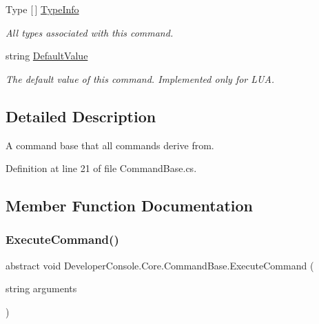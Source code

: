 \begin{DoxyCompactItemize}
Type \mbox{[}$\,$\mbox{]} \hyperlink{class_developer_console_1_1_core_1_1_command_base_afefb8c75e0ba04ef689e501009cd982e}{Type\+Info}
\begin{DoxyCompactList}\small\item\em All types associated with this command. \end{DoxyCompactList}\item 
string \hyperlink{class_developer_console_1_1_core_1_1_command_base_a89ad8df5714aa61c63c35c53860d6836}{Default\+Value}
\begin{DoxyCompactList}\small\item\em The default value of this command. Implemented only for L\+UA. \end{DoxyCompactList}\end{DoxyCompactItemize}


\subsection{Detailed Description}
A command base that all commands derive from. 



Definition at line 21 of file Command\+Base.\+cs.



\subsection{Member Function Documentation}
\mbox{\label{class_developer_console_1_1_core_1_1_command_base_ab68054239b7e3d2a47029839f90d59ca}} 
\subsubsection{\texorpdfstring{Execute\+Command()}{ExecuteCommand()}}
{\footnotesize\ttfamily abstract void Developer\+Console.\+Core.\+Command\+Base.\+Execute\+Command (\begin{DoxyParamCaption}\item[{string}]{arguments }\end{DoxyParamCaption})\hspace{0.3cm}{\ttfamily [pure virtual]}}




